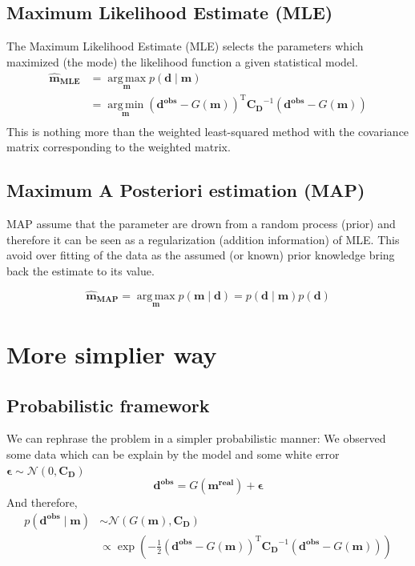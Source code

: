 \documentclass[twocolumn]{article}
\numberwithin{equation}{section}
\begin{document}
	\subsection{Maximum Likelihood Estimate (MLE)}
The Maximum Likelihood Estimate (MLE) selects the parameters which maximized (the mode) the likelihood function a given statistical model.
\begin{align*}
\mathbf{\hat{m}_{MLE}}
&=\operatorname*{arg\,max}_\mathbf{m} p(\mathbf{d}\mid \mathbf{m})\\
&=\operatorname*{arg\,min}_\mathbf{m}  (\mathbf{d^{obs}}-G(\mathbf{m}))^\mathrm{T} \mathbf{C_D}^{-1} (\mathbf{d^{obs}}-G(\mathbf{m}))\\
\end{align*}
This is nothing more than the weighted least-squared method with the covariance matrix corresponding to the weighted matrix.

	\subsection{Maximum A Posteriori estimation (MAP)}
MAP assume that the parameter are drown from a random process (prior) and therefore it can be seen as a regularization (addition information) of MLE. This avoid over fitting of the data as the assumed (or known) prior knowledge bring back the estimate to its value.

$$\mathbf{\hat{m}_{MAP}}=\operatorname*{arg\,max}_\mathbf{m} p(\mathbf{m}\mid \mathbf{d})=  p(\mathbf{d}\mid \mathbf{m})  p(\mathbf{d})$$



\newpage
\section{More simplier way} 
 	\subsection{Probabilistic framework}
We can rephrase the problem in a simpler probabilistic manner: We observed some data which can be explain by the model and some white error $\boldsymbol \epsilon \sim \mathcal{N} (0,\mathbf{C_D})$
$$ \mathbf{d^{obs}} = G(\mathbf{m^{real}}) +\boldsymbol \epsilon$$
And therefore,
\begin{align*}
p(\mathbf{d^{obs}} \mid \mathbf{m} )
&\sim \mathcal{N} (G(\mathbf{m}),\mathbf{C_D})\\ 
&\propto \exp \left( -\frac{1}{2} (\mathbf{d^{obs}}-G(\mathbf{m}))^\mathrm{T} \mathbf{C_D}^{-1} (\mathbf{d^{obs}}-G(\mathbf{m})) \right)
\end{align*}
\end{document}

